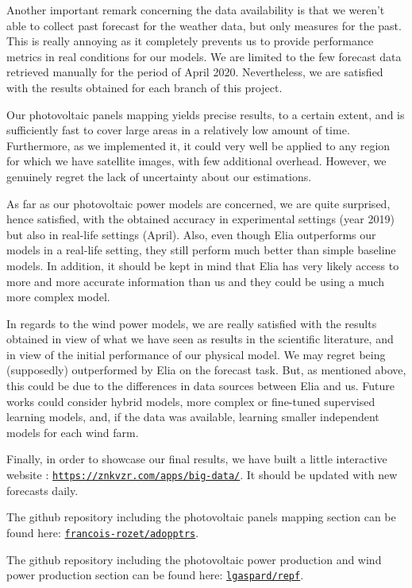 \documentclass[a4paper, 12pt]{article}
\begin{document}
Another important remark concerning the data availability is that we weren't able to collect past forecast for the weather data, but only measures for the past. This is really annoying as it completely prevents us to provide performance metrics in real conditions for our models. We are limited to the few forecast data retrieved manually for the period of April 2020. 
Nevertheless, we are satisfied with the results obtained for each branch of this project.

Our photovoltaic panels mapping yields precise results, to a certain extent, and is sufficiently fast to cover large areas in a relatively low amount of time. Furthermore, as we implemented it, it could very well be applied to any region for which we have satellite images, with few additional overhead. However, we genuinely regret the lack of uncertainty about our estimations.

As far as our photovoltaic power models are concerned, we are quite surprised, hence satisfied, with the obtained accuracy in experimental settings (year 2019) but also in real-life settings (April). Also, even though Elia outperforms our models in a real-life setting, they still perform much better than simple baseline models. In addition, it should be kept in mind that Elia has very likely access to more and more accurate information than us and they could be using a much more complex model.

In regards to the wind power models, we are really satisfied with the results obtained in view of what we have seen as results in the scientific literature, and in view of the initial performance of our physical model. We may regret being (supposedly) outperformed by Elia on the forecast task. But, as mentioned above, this could be due to the differences in data sources between Elia and us. Future works could consider hybrid models, more complex or fine-tuned supervised learning models, and, if the data was available, learning smaller independent models for each wind farm.

Finally, in order to showcase our final results, we have built a little interactive website : \href{https://znkvzr.com/apps/big-data/}{\texttt{https://znkvzr.com/apps/big-data/}}. It should be updated with new forecasts daily.

The github repository including the photovoltaic panels mapping section can be found here: \href{https://github.com/francois-rozet/adopptrs/}{\texttt{francois-rozet/adopptrs}}.

The github repository including the photovoltaic power production and wind power production section can be found here: \href{https://github.com/lgaspard/repf/}{\texttt{lgaspard/repf}}.
\end{document}
